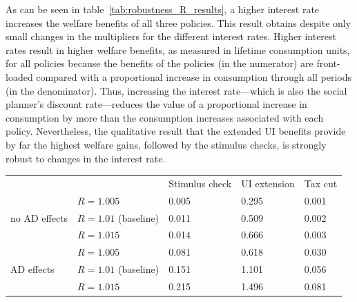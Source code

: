 \documentclass{econsocart}
\begin{document}
As can be seen in table~\ref{tab:robustness_R_results}, a higher interest rate increases the welfare benefits of all three policies.
This result obtains despite only small changes in the multipliers for the different interest rates.
Higher interest rates result in higher welfare benefits, as measured in lifetime consumption units, for all policies because the benefits of the policies (in the numerator) are front-loaded compared with a proportional increase in consumption through all periods (in the denominator).
Thus, increasing the interest rate---which is also the social planner's discount rate---reduces the value of a proportional increase in consumption by more than the consumption increases associated with each policy.
Nevertheless, the qualitative result that the extended UI benefits provide by far the highest welfare gains, followed by the stimulus checks, is strongly robust to changes in the interest rate.

\begin{center}
  \begin{tabular}
    {@{}lllll@{}}
    \toprule
                                   &                       & Stimulus check & UI extension & Tax cut \\ \cmidrule(l){1-5}
    \multirow{3}{*}{no AD effects} & $R = 1.005$           & 0.005          & 0.295        & 0.001   \\
                                   & $R = 1.01$ (baseline) & 0.011          & 0.509        & 0.002   \\
                                   & $R = 1.015$           & 0.014          & 0.666        & 0.003   \\ \cmidrule(l){1-5}
    \multirow{3}{*}{AD effects}    & $R = 1.005$           & 0.081          & 0.618        & 0.030   \\
                                   & $R = 1.01$ (baseline) & 0.151          & 1.101        & 0.056   \\
                                   & $R = 1.015$           & 0.215          & 1.496        & 0.081   \\ \cmidrule(l){1-5}
  \end{tabular}
  \label{tab:robustness_R_results}
\end{center}
\end{document}
